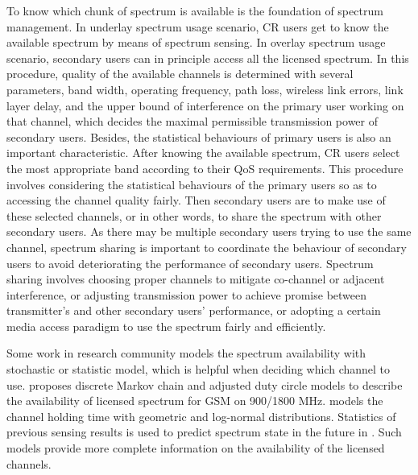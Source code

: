To know which chunk of spectrum is available is the foundation of spectrum management.
In underlay spectrum usage scenario, CR users get to know the available spectrum by means of spectrum sensing.
In overlay spectrum usage scenario, secondary users can in principle access all the licensed spectrum.
In this procedure, quality of the available channels is determined with several parameters, \ie band width, operating frequency, path loss, wireless link errors, link layer delay, and the upper bound of interference on the primary user working on that channel, which decides the maximal permissible transmission power of secondary users.
Besides, the statistical behaviours of primary users is also an important characteristic.
%
After knowing the available spectrum, CR users select the most appropriate band according to their QoS requirements.
This procedure involves considering the statistical behaviours of the primary users so as to accessing the channel quality fairly.
%
Then secondary users are to make use of these selected channels, or in other words, to share the spectrum with other secondary users. 
As there may be multiple secondary users trying to use the same channel, spectrum sharing is important to coordinate the behaviour of secondary users to avoid deteriorating the performance of secondary users.
Spectrum sharing involves choosing proper channels to mitigate co-channel or adjacent interference, or adjusting transmission power to achieve promise between transmitter's and other secondary users' performance, or adopting a certain media access paradigm to use the spectrum fairly and efficiently.



Some work in research community models the spectrum availability with stochastic or statistic model, which is helpful when deciding which channel to use.
\cite{Discrete-Time_Spectrum_Occupancy_Model_DySPAN_2011} proposes discrete Markov chain and adjusted duty circle models to describe the availability of licensed spectrum for GSM on 900/1800 MHz.
\cite{Wellens200910} models the channel holding time with geometric and log-normal distributions.
Statistics of previous sensing results is used to predict spectrum state in the future in \cite{spectrum-discovery-tmc08}.
Such models provide more complete information on the availability of the licensed channels.


